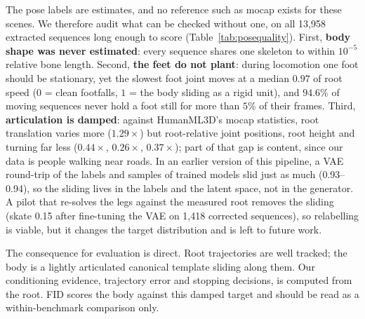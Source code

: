 \documentclass{ieeeoj}
\begin{document}
The pose labels are estimates, and no reference such as mocap exists for these scenes. We therefore audit what can be checked without one, on all 13{,}958 extracted sequences long enough to score (Table~\ref{tab:posequality}).
First, \textbf{body shape was never estimated}: every sequence shares one skeleton to within $10^{-5}$ relative bone length.
Second, \textbf{the feet do not plant}: during locomotion one foot should be stationary, yet the slowest foot joint moves at a median $0.97$ of root speed ($0$ = clean footfalls, $1$ = the body sliding as a rigid unit), and $94.6\%$ of moving sequences never hold a foot still for more than $5\%$ of their frames.
Third, \textbf{articulation is damped}: against HumanML3D's mocap statistics, root translation varies more ($1.29\times$) but root-relative joint positions, root height and turning far less ($0.44\times$, $0.26\times$, $0.37\times$); part of that gap is content, since our data is people walking near roads.
In an earlier version of this pipeline, a VAE round-trip of the labels and samples of trained models slid just as much (0.93--0.94), so the sliding lives in the labels and the latent space, not in the generator.
A pilot that re-solves the legs against the measured root removes the sliding (skate 0.15 after fine-tuning the VAE on 1{,}418 corrected sequences), so relabelling is viable, but it changes the target distribution and is left to future work.

The consequence for evaluation is direct. Root trajectories are well tracked; the body is a lightly articulated canonical template sliding along them. Our conditioning evidence, trajectory error and stopping decisions, is computed from the root. FID scores the body against this damped target and should be read as a within-benchmark comparison only.
\end{document}
